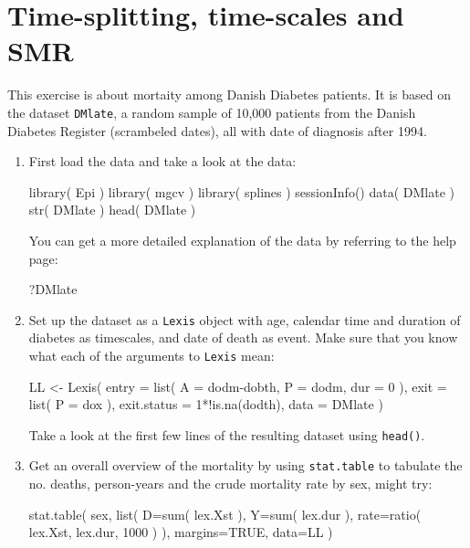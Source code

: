 
\renewcommand{\rwpre}{./graph/DMDK}
\section{Time-splitting, time-scales and SMR}
This exercise is about mortaity among Danish Diabetes patients. It is
based on the dataset \texttt{DMlate}, a random sample of 10,000
patients from the Danish Diabetes Register (scrambeled dates), all
with date of diagnosis after 1994.
\begin{enumerate}
\item First load the data and take a look at the data:
\begin{Schunk}
\begin{Sinput}
 library( Epi )
 library( mgcv )
 library( splines )
 sessionInfo()
 data( DMlate )
 str( DMlate )
 head( DMlate )
\end{Sinput}
\end{Schunk}
You can get a more detailed explanation of the data by referring to
the help page:
\begin{Schunk}
\begin{Sinput}
 ?DMlate
\end{Sinput}
\end{Schunk}
\item Set up the dataset as a \texttt{Lexis} object with age, calendar
  time and duration of diabetes as timescales, and date of death as
  event. Make sure that you know what each of the arguments to
  \texttt{Lexis} mean:
\begin{Schunk}
\begin{Sinput}
 LL <- Lexis( entry = list( A = dodm-dobth,
                            P = dodm,
                          dur = 0 ),
               exit = list( P = dox ),
        exit.status = 1*!is.na(dodth),
               data = DMlate )
\end{Sinput}
\end{Schunk}
Take a look at the first few lines of the resulting dataset using \texttt{head()}.
\item Get an overall overview of the mortality by using
  \texttt{stat.table} to tabulate the no. deaths, person-years and the
  crude mortality rate by sex, might try:
\begin{Schunk}
\begin{Sinput}
 stat.table( sex,
             list( D=sum( lex.Xst ),
                   Y=sum( lex.dur ),
                rate=ratio( lex.Xst, lex.dur, 1000 ) ),
             margins=TRUE,
             data=LL )
\end{Sinput}

\end{Schunk}
\end{enumerate}
